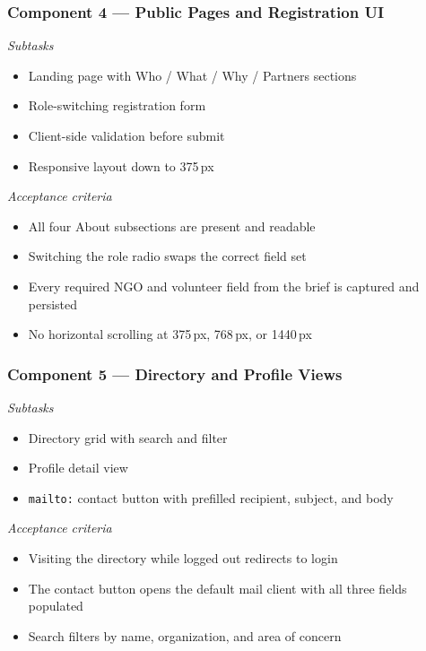 \documentclass[11pt,letterpaper]{article}
\begin{document}
\subsubsection*{Component 4 --- Public Pages and Registration UI}
\textit{Subtasks}
\begin{itemize}
  \item Landing page with Who / What / Why / Partners sections
  \item Role-switching registration form
  \item Client-side validation before submit
  \item Responsive layout down to 375\,px
\end{itemize}
\textit{Acceptance criteria}
\begin{itemize}
  \item All four About subsections are present and readable
  \item Switching the role radio swaps the correct field set
  \item Every required NGO and volunteer field from the brief is captured and persisted
  \item No horizontal scrolling at 375\,px, 768\,px, or 1440\,px
\end{itemize}

\subsubsection*{Component 5 --- Directory and Profile Views}
\textit{Subtasks}
\begin{itemize}
  \item Directory grid with search and filter
  \item Profile detail view
  \item \texttt{mailto:} contact button with prefilled recipient, subject, and body
\end{itemize}
\textit{Acceptance criteria}
\begin{itemize}
  \item Visiting the directory while logged out redirects to login
  \item The contact button opens the default mail client with all three fields populated
  \item Search filters by name, organization, and area of concern
\end{itemize}
\end{document}
